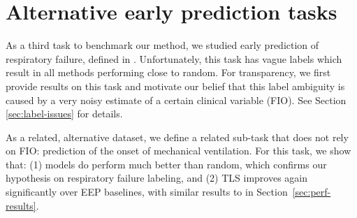 \documentclass[nohyperref]{article}
\begin{document}
\begin{comment}
    \end{subfigure}
    \caption{{\textbf{AUPRC performance of temporal label smoothing combined with weighted cross-entropy}. (Left) Test set performance. (Right) Validation set performance.}}
    \label{fig:tls_wce}
\end{figure}

Finally, we investigated whether temporal label smoothing could be combined with other objective functions to leverage their respective added value and further improve prediction performance. {The performance of temporal label smoothing combined with a weighted cross-entropy objective is given in Figure \ref{fig:tls_wce}. Balanced reweighting per class results in a performance drop, as observed when applied to traditional cross-entropy (see Section \ref{sec:perf-results}, Figure \ref{fig:focal+weighted}). Another possible approach to combine these methods would be to leverage temporal information in sample re-weighting, and we reserve this investigation for further work. 

Similarly, no additional performance gains were obtained from combining multi-horizon prediction or focal loss with temporal label smoothing over using TLS with cross-entropy loss.}
\end{comment}

\newpage
\section{Alternative early prediction tasks}\label{appendix:resp}

As a third task to benchmark our method, we studied early prediction of respiratory failure, defined in \citet{yeche2021}. Unfortunately, this task has vague labels which result in all methods performing close to random. For transparency, we first provide results on this task and motivate our belief that this label ambiguity is caused by a very noisy estimate of a certain clinical variable (FIO). See Section \ref{sec:label-issues} for details. 

As a related, alternative dataset, we define a related sub-task that does not rely on FIO: prediction of the onset of mechanical ventilation. For this task, we show that: (1) models do perform much better than random, which confirms our hypothesis on respiratory failure labeling, and (2) TLS improves again significantly over EEP baselines, with similar results to in Section~\ref{sec:perf-results}.
\end{document}
